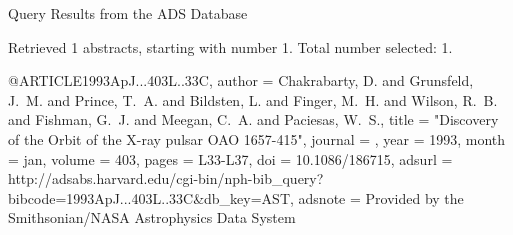 Query Results from the ADS Database


Retrieved 1 abstracts, starting with number 1.  Total number selected: 1.

@ARTICLE{1993ApJ...403L..33C,
   author = {{Chakrabarty}, D. and {Grunsfeld}, J.~M. and {Prince}, T.~A. and 
	{Bildsten}, L. and {Finger}, M.~H. and {Wilson}, R.~B. and {Fishman}, G.~J. and 
	{Meegan}, C.~A. and {Paciesas}, W.~S.},
    title = "{Discovery of the Orbit of the X-ray pulsar OAO 1657-415}",
  journal = {\apjl},
     year = 1993,
    month = jan,
   volume = 403,
    pages = {L33-L37},
      doi = {10.1086/186715},
   adsurl = {http://adsabs.harvard.edu/cgi-bin/nph-bib_query?bibcode=1993ApJ...403L..33C&db_key=AST},
  adsnote = {Provided by the Smithsonian/NASA Astrophysics Data System}
}


